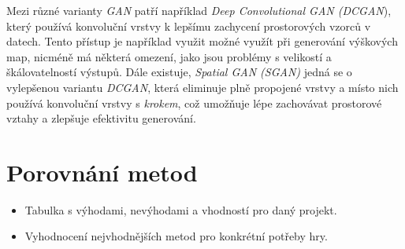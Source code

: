 Mezi různé varianty \textit{GAN} patří například \textit{Deep Convolutional GAN (DCGAN}), který používá konvoluční vrstvy k lepšímu zachycení prostorových vzorců v datech. Tento přístup je například využit možné využít při generování výškových map, nicméně má některá omezení, jako jsou problémy s velikostí a škálovatelností výstupů. Dále existuje, \textit{Spatial GAN (SGAN)} jedná se o vylepšenou variantu \textit{DCGAN}, která eliminuje plně propojené vrstvy a místo nich používá konvoluční vrstvy s \textit{krokem}, což umožňuje lépe zachovávat prostorové vztahy a zlepšuje efektivitu generování. \cite{GANclanek}



\section{Porovnání metod}
\begin{itemize}
    \item Tabulka s výhodami, nevýhodami a vhodností pro daný projekt.
    \item Vyhodnocení nejvhodnějších metod pro konkrétní potřeby hry.
\end{itemize}
